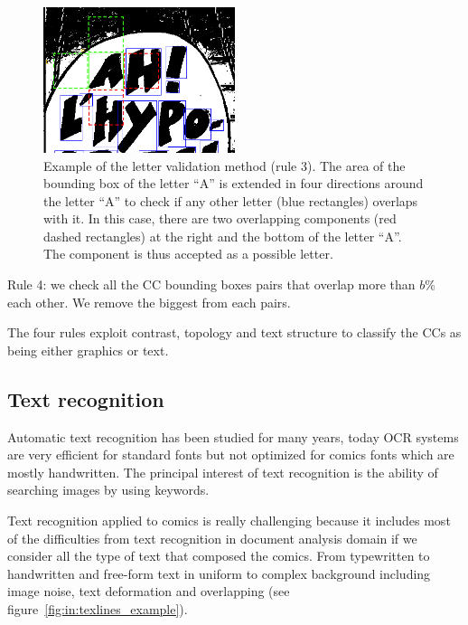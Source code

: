 	\begin{figure}[h!]	%
	  \centering
		\includegraphics[width=0.50\textwidth]{4_direction.png}
		\caption[Text extraction neighbourhood validation]{Example of the letter validation method (rule 3). The area of the bounding box of the letter ``A'' is extended in four directions around the letter ``A'' to check if any other letter (blue rectangles) overlaps with it. In this case, there are two overlapping components (red dashed rectangles) at the right and the bottom of the letter ``A''. The component is thus accepted as a possible letter.}
		\label{fig:in:4_direction}
	\end{figure}

Rule 4:
we check all the CC bounding boxes pairs that overlap more than $b$\% each other. We remove the biggest from each pairs.

The four rules exploit contrast, topology and text structure to classify the CCs as being either graphics or text.


\subsection{Text recognition} %
\label{sub:te:text_recognition}
Automatic text recognition has been studied for many years, today OCR systems are very efficient for standard fonts but not optimized for comics fonts which are mostly handwritten.
The principal interest of text recognition is the ability of searching images by using keywords.

Text recognition applied to comics is really challenging because it includes most of the difficulties from text recognition in document analysis domain if we consider all the type of text that composed the comics.
From typewritten to handwritten and free-form text in uniform to complex background including image noise, text deformation and overlapping (see figure~\ref{fig:in:texlines_example}).

